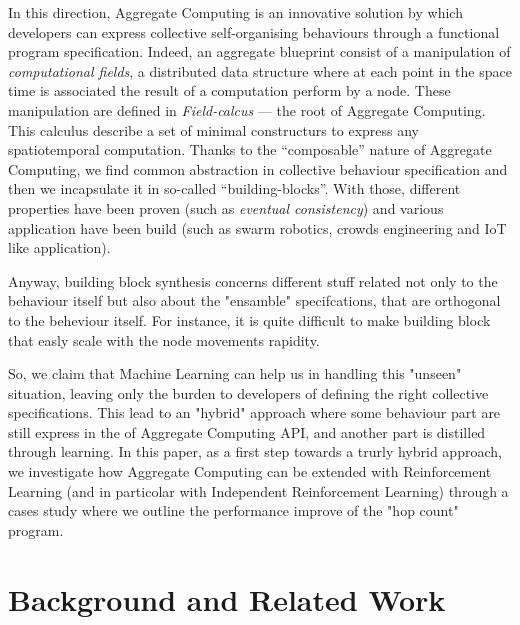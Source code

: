 \documentclass[
  twocolumn,
]{ceurart}
\begin{document}
In this direction, Aggregate Computing is an innovative solution by which 
 developers can express collective self-organising behaviours through a functional program specification.
%
Indeed, an aggregate blueprint consist of a manipulation of \textit{computational fields}, a distributed
 data structure where at each point in the space time is associated the result of a computation
 perform by a node.
%
These manipulation are defined in \textit{Field-calcus} --- the root of Aggregate Computing. 
 This calculus describe a set of minimal constructurs to express any spatiotemporal computation.
%
Thanks to the ``composable'' nature of Aggregate Computing, we find common abstraction 
 in collective behaviour specification and then we incapsulate it in so-called ``building-blocks''.
%
With those, different properties have been proven (such as \textit{eventual consistency}) and various
 application have been build (such as swarm robotics, crowds engineering and IoT like application).

Anyway, building block synthesis concerns different stuff related not only to the behaviour itself
 but also about the "ensamble" specifcations, that are orthogonal to the
 beheviour itself. For instance, it is quite difficult to make building block
 that easly scale with the node movements rapidity.

So, we claim that Machine Learning can help us in handling this "unseen" situation, leaving only the burden
 to developers of defining the right collective specifications.
%
This lead to an "hybrid" approach where some behaviour part are still express in the of Aggregate Computing
 API, and another part is distilled through learning.
%
In this paper, as a first step towards a trurly hybrid approach, we investigate how Aggregate Computing can be
 extended with Reinforcement Learning (and in particolar with Independent Reinforcement Learning) through a cases
 study where we outline the performance improve of the "hop count" program.
 

\section{Background and Related Work}
\end{document}
